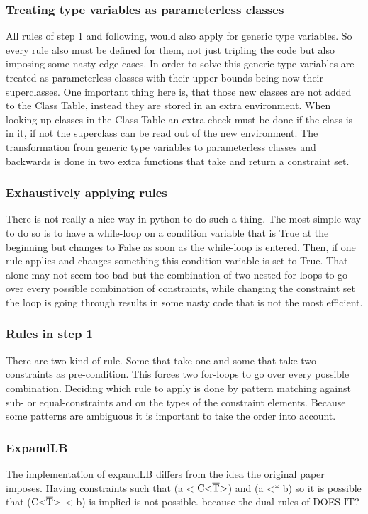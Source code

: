\subsubsection{Treating type variables as parameterless classes}
All rules of step 1 and following, would also apply for generic type variables. So every rule also must be defined for them, not just tripling the code but also imposing some nasty edge cases. In order to solve this generic type variables are treated as parameterless classes with their upper bounds being now their superclasses. One important thing here is, that those new classes are not added to the Class Table, instead they are stored in an extra environment. When looking up classes in the Class Table an extra check must be done if the class is in it, if not the superclass can be read out of the new environment.
The transformation from  generic type variables to parameterless classes and backwards is done in two extra functions that take and return a constraint set.

\subsubsection{Exhaustively applying rules}
There is not really a nice way in python to do such a thing. The most simple way to do so is to have a while-loop on a condition variable  that is True at the beginning but changes to False as soon as the while-loop is entered. Then, if one rule applies and changes something this condition variable is set to True. That alone may not seem too bad but the combination of two nested for-loops to go over every possible combination of constraints, while changing the constraint set the loop is going through results in some nasty code that is not the most efficient.

\subsubsection{Rules in step 1}
There are two kind of rule. Some that take one and some that take two constraints as pre-condition. This forces two for-loops to go over every possible combination. Deciding which rule to apply is done by pattern matching against sub- or equal-constraints and on the types of the constraint elements. Because some patterns are ambiguous it is important to take the order into account.

\subsubsection{ExpandLB}
The implementation of expandLB differs from the idea the original paper imposes. Having constraints such that (a < $\text{C<}\overline{\text{T}}\text{>}$) and (a <* b) so it is possible that ($\text{C<}\overline{\text{T}}\text{>}$ < b) is implied is not possible. because the dual rules of DOES IT?

